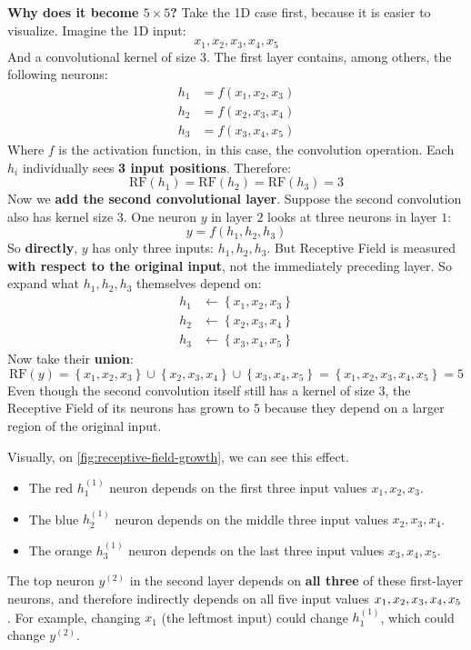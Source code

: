 \highspace
\textcolor{Green3}{ \textbf{Why does it become $5 \times 5$?}} Take the 1D case first, because it is easier to visualize. Imagine the 1D input:
\begin{equation*}
    x_1, x_2, x_3, x_4, x_5
\end{equation*}
And a convolutional kernel of size $3$. The first layer contains, among others, the following neurons:
\begin{align*}
    h_1 &= f(x_1, x_2, x_3) \\
    h_2 &= f(x_2, x_3, x_4) \\
    h_3 &= f(x_3, x_4, x_5)
\end{align*}
Where $f$ is the activation function, in this case, the convolution operation. Each $h_i$ individually sees \textbf{3 input positions}. Therefore:
\begin{equation*}
    \mathrm{RF}(h_1) = \mathrm{RF}(h_2) = \mathrm{RF}(h_3) = 3
\end{equation*}
Now we \textbf{add the second convolutional layer}. Suppose the second convolution also has kernel size $3$. One neuron $y$ in layer $2$ looks at three neurons in layer $1$:
\begin{equation*}
    y = f(h_1, h_2, h_3)
\end{equation*}
So \textbf{directly}, $y$ has only three inputs: $h_1, h_2, h_3$. But Receptive Field is measured \textbf{with respect to the original input}, not the immediately preceding layer. So expand what $h_1, h_2, h_3$ themselves depend on:
\begin{align*}
    h_1 &\leftarrow \left\{x_1, x_2, x_3\right\} \\
    h_2 &\leftarrow \left\{x_2, x_3, x_4\right\} \\
    h_3 &\leftarrow \left\{x_3, x_4, x_5\right\}
\end{align*}
Now take their \textbf{union}:
\begin{equation*}
    \mathrm{RF}(y) = \left\{x_1, x_2, x_3\right\} \cup \left\{x_2, x_3, x_4\right\} \cup \left\{x_3, x_4, x_5\right\} = \left\{x_1, x_2, x_3, x_4, x_5\right\} = 5
\end{equation*}
Even though the second convolution itself still has a kernel of size $3$, the Receptive Field of its neurons has grown to $5$ because they depend on a larger region of the original input.

\highspace
Visually, on \autoref{fig:receptive-field-growth}, we can see this effect.
\begin{itemize}
    \item The red $h_1^{(1)}$ neuron depends on the first three input values $x_1, x_2, x_3$.
    \item The blue $h_2^{(1)}$ neuron depends on the middle three input values $x_2, x_3, x_4$.
    \item The orange $h_3^{(1)}$ neuron depends on the last three input values $x_3, x_4, x_5$.
\end{itemize}
The top neuron $y^{(2)}$ in the second layer depends on \textbf{all three} of these first-layer neurons, and therefore indirectly depends on all five input values $x_1, x_2, x_3, x_4,\break x_5$. For example, changing $x_1$ (the leftmost input) could change $h_1^{(1)}$, which could change $y^{(2)}$.

